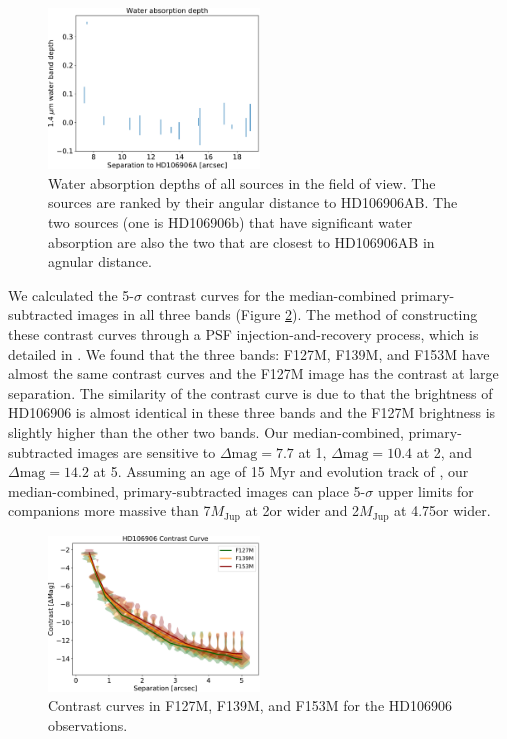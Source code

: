 \documentclass[twocolumn]{aastex62}
\newcommand{\mjup}{\ensuremath{M_\mathrm{Jup}}\xspace}
\begin{document}
\begin{figure}
  \centering
  \includegraphics[width=0.5\textwidth]{figures/bck_waterdepth.pdf}
  \caption{Water absorption depths of all sources in the field of view. The sources are ranked by their angular distance to HD106906AB. The two sources (one is HD106906b) that have significant water absorption are also the two that are closest to HD106906AB in agnular distance.}
  \label{fig:backgroundsources}
\end{figure}

We calculated the 5-$\sigma$ contrast curves for the median-combined primary-subtracted images in all three bands (Figure \ref{fig:contrast_curve}). The method of constructing these contrast curves through a PSF injection-and-recovery process, which is detailed in  \citet{Zhou2019}.  We found that the three bands: F127M, F139M, and F153M have almost the same contrast curves and the F127M image has the contrast at large separation. The similarity of the contrast curve is due to that the brightness of HD106906 is almost identical in these three bands and the F127M brightness is slightly higher than the other two bands. Our median-combined, primary-subtracted images are sensitive to $\Delta \mbox{mag}=7.7$ at 1\arcsec, $\Delta \mbox{mag}=10.4$ at 2\arcsec, and $\Delta \mbox{mag}=14.2$ at 5\arcsec. Assuming an age of 15 Myr and evolution track of \citet{Saumon}, our median-combined, primary-subtracted images can place 5-$\sigma$ upper limits for companions more massive than 7\mjup at 2\arcsec or wider and 2\mjup at 4.75\arcsec or wider.

\begin{figure}
  \centering
  \includegraphics[width=0.5\textwidth]{figures/contrast_curve.pdf}
  \caption{Contrast curves in F127M, F139M, and F153M for the HD106906 observations.}
  \label{fig:contrast_curve}
\end{figure}
\end{document}
